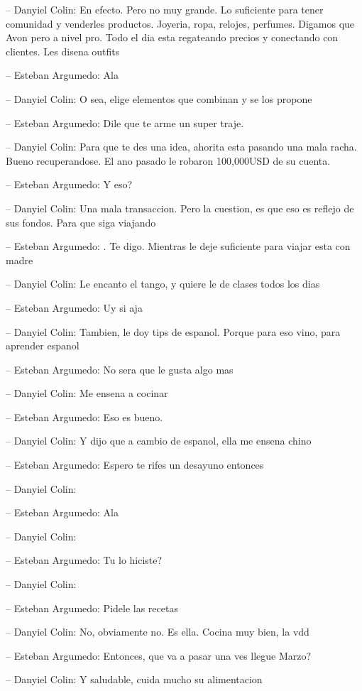 -- Danyiel Colin: En efecto. Pero no muy grande. Lo suficiente para
tener comunidad y venderles productos. Joyeria, ropa, relojes, perfumes.
Digamos que Avon pero a nivel pro. Todo el dia esta regateando precios y
conectando con clientes. Les disena outfits

-- Esteban Argumedo: Ala

-- Danyiel Colin: O sea, elige elementos que combinan y se los propone

-- Esteban Argumedo: Dile que te arme un super traje.

-- Danyiel Colin: Para que te des una idea, ahorita esta pasando una
mala racha. Bueno recuperandose. El ano pasado le robaron 100,000USD de
su cuenta.

-- Esteban Argumedo: Y eso?

-- Danyiel Colin: Una mala transaccion. Pero la cuestion, es que eso es
reflejo de sus fondos. Para que siga viajando

-- Esteban Argumedo: . Te digo. Mientras le deje suficiente para viajar
esta con madre

-- Danyiel Colin: Le encanto el tango, y quiere le de clases todos los
dias

-- Esteban Argumedo: Uy si aja

-- Danyiel Colin: Tambien, le doy tips de espanol. Porque para eso vino,
para aprender espanol

-- Esteban Argumedo: No sera que le gusta algo mas

-- Danyiel Colin: Me ensena a cocinar

-- Esteban Argumedo: Eso es bueno.

-- Danyiel Colin: Y dijo que a cambio de espanol, ella me ensena chino

-- Esteban Argumedo: Espero te rifes un desayuno entonces

-- Danyiel Colin:

-- Esteban Argumedo: Ala

-- Danyiel Colin:

-- Esteban Argumedo: Tu lo hiciste?

-- Danyiel Colin:

-- Esteban Argumedo: Pidele las recetas

-- Danyiel Colin: No, obviamente no. Es ella. Cocina muy bien, la vdd

-- Esteban Argumedo: Entonces, que va a pasar una ves llegue Marzo?

-- Danyiel Colin: Y saludable, cuida mucho su alimentacion

